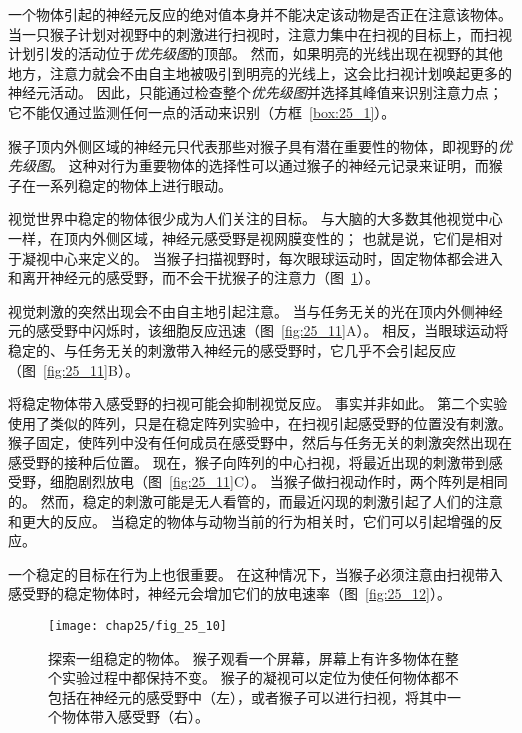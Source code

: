 一个物体引起的神经元反应的绝对值本身并不能决定该动物是否正在注意该物体。
当一只猴子计划对视野中的刺激进行扫视时，注意力集中在扫视的目标上，而扫视计划引发的活动位于\textit{优先级图}的顶部。
然而，如果明亮的光线出现在视野的其他地方，注意力就会不由自主地被吸引到明亮的光线上，这会比扫视计划唤起更多的神经元活动。
因此，只能通过检查整个\textit{优先级图}并选择其峰值来识别注意力点；
它不能仅通过监测任何一点的活动来识别（方框~\ref{box:25_1}）。


\begin{proposition} \label{box:25_1}
	
	\quad \quad 猴子顶内外侧区域的神经元只代表那些对猴子具有潜在重要性的物体，即视野的\textit{优先级图}。
	这种对行为重要物体的选择性可以通过猴子的神经元记录来证明，而猴子在一系列稳定的物体上进行眼动。
	
	\quad \quad 视觉世界中稳定的物体很少成为人们关注的目标。
	与大脑的大多数其他视觉中心一样，在顶内外侧区域，神经元感受野是视网膜变性的；
	也就是说，它们是相对于凝视中心来定义的。
	当猴子扫描视野时，每次眼球运动时，固定物体都会进入和离开神经元的感受野，而不会干扰猴子的注意力（图~\ref{fig:25_10}）。
	
	\quad \quad 视觉刺激的突然出现会不由自主地引起注意。
	当与任务无关的光在顶内外侧神经元的感受野中闪烁时，该细胞反应迅速（图~\ref{fig:25_11}A）。
	相反，当眼球运动将稳定的、与任务无关的刺激带入神经元的感受野时，它几乎不会引起反应（图~\ref{fig:25_11}B）。
	
	\quad \quad 将稳定物体带入感受野的扫视可能会抑制视觉反应。
	事实并非如此。
	第二个实验使用了类似的阵列，只是在稳定阵列实验中，在扫视引起感受野的位置没有刺激。
	猴子固定，使阵列中没有任何成员在感受野中，然后与任务无关的刺激突然出现在感受野的接种后位置。
	现在，猴子向阵列的中心扫视，将最近出现的刺激带到感受野，细胞剧烈放电（图~\ref{fig:25_11}C）。
	当猴子做扫视动作时，两个阵列是相同的。
	然而，稳定的刺激可能是无人看管的，而最近闪现的刺激引起了人们的注意和更大的反应。
	当稳定的物体与动物当前的行为相关时，它们可以引起增强的反应。
	
	\quad \quad 一个稳定的目标在行为上也很重要。
	在这种情况下，当猴子必须注意由扫视带入感受野的稳定物体时，神经元会增加它们的放电速率（图~\ref{fig:25_12}）。
	
\end{proposition}


\begin{figure}[htbp]
	\centering
	\texttt{[image: chap25/fig\_25\_10]}
	\caption{探索一组稳定的物体。
		猴子观看一个屏幕，屏幕上有许多物体在整个实验过程中都保持不变。
		猴子的凝视可以定位为使任何物体都不包括在神经元的感受野中（左），或者猴子可以进行扫视，将其中一个物体带入感受野（右）。}
	\label{fig:25_10}
\end{figure}


